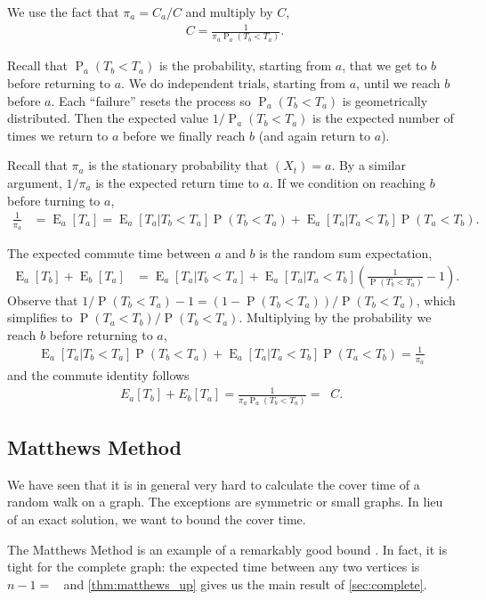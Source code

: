 \documentclass[12pt]{article}
\theoremstyle{definition}
\DeclareMathOperator{\E}{\mathrm{E}}		     %
\DeclareMathOperator{\pr}{\mathrm{P}}		     %
\DeclareMathOperator{\hit}{t_{\textrm{hit}}}     %
\DeclareMathOperator{\Reff}{R_{\textrm{eff}}}    %
\begin{document}
We use the fact that $\pi_a = C_a / C$ and multiply by $C$,
\begin{align}
\Reff C = \frac{1}{\pi_a \pr_a(T_b < T_a)}. \nonumber
\end{align}

Recall that $\pr_a(T_b < T_a)$ is the probability, starting from $a$,
that we get to $b$ before returning to $a$.
We do independent trials, starting from $a$, until we reach $b$ before $a$.
Each ``failure'' resets the process so $\pr_a(T_b < T_a)$ is geometrically distributed.
Then the expected value $1/\pr_a(T_b < T_a)$ is the expected number of times
we return to $a$ before we finally reach $b$ (and again return to $a$).

Recall that $\pi_a$ is the stationary probability that $(X_t) = a$.
By a similar argument, $1/\pi_a$ is the expected return time to $a$.
If we condition on reaching $b$ before turning to $a$,
\begin{align}
\frac{1}{\pi_a} &= \E_a[T_a] =
\E_a[T_a|T_b < T_a] \pr(T_b<T_a) +
\E_a[T_a|T_a < T_b] \pr(T_a<T_b) \nonumber.
\end{align}

The expected commute time between $a$ and $b$ is the
random sum expectation,
\begin{align}
\E_a[T_b] + \E_b[T_a] &= 
\E_a[T_a | T_b < T_a] + 
\E_a[T_a | T_a < T_b] (\frac{1}{\pr(T_b<T_a)} - 1) \nonumber.
\end{align}
Observe that $1/\pr(T_b<T_a)-1 = (1-\pr(T_b<T_a))/\pr(T_b<T_a)$, 
which simplifies to $\pr(T_a<T_b)/\pr(T_b<T_a)$.
Multiplying by the probability we reach $b$ before returning to $a$,
\begin{align}
\E_a[T_a|T_b < T_a] \pr(T_b<T_a) + \E_a[T_a|T_a<T_b] \pr(T_a<T_b)=\frac{1}{\pi_a} \nonumber
\end{align}
and the commute identity follows
\begin{align}
E_a[T_b] + E_b[T_a] = \frac{1}{\pi_a \pr_a(T_b < T_a)} = \Reff C.
\label{eqn:commute}
\end{align}

\subsection{Matthews Method}\label{sec:matthews}
We have seen that it is in general very hard
to calculate the cover time of a random walk
on a graph.
The exceptions are symmetric or small graphs.
In lieu of an exact solution, we want to 
bound the cover time.

The Matthews Method is an example of a remarkably good bound \cite{LP17}.
In fact, it is tight for the complete graph:
the expected time between any two vertices
is $n-1 = \hit$ and \cref{thm:matthews_up} gives
us the main result of \cref{sec:complete}.
\end{document}
